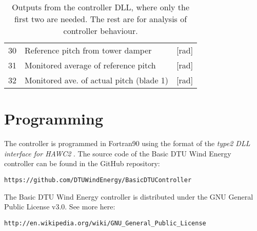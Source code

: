 \begin{table}[t]
\begin{tabular}{r|ll}
30& Reference pitch from tower damper                                & [rad]\\          %
31& Monitored average of reference pitch                             & [rad] \\         %
32& Monitored ave. of actual pitch (blade 1)                         & [rad]            %
\end{tabular}
\caption{Outputs from the controller DLL, where only the first two are needed. The rest are for analysis of controller behaviour.  \label{t:output}}
\end{table}


\section{Programming}

The controller is programmed in Fortran90 using the format of the \emph{type2 DLL interface for HAWC2} \cite{Larsen12}. The source code of the Basic DTU Wind Energy controller can be found in the GitHub repository:
\begin{verbatim}
https://github.com/DTUWindEnergy/BasicDTUController
\end{verbatim}
The Basic DTU Wind Energy controller is distributed under the GNU General Public License v3.0. See more here:
\begin{verbatim}
http://en.wikipedia.org/wiki/GNU_General_Public_License
\end{verbatim}

